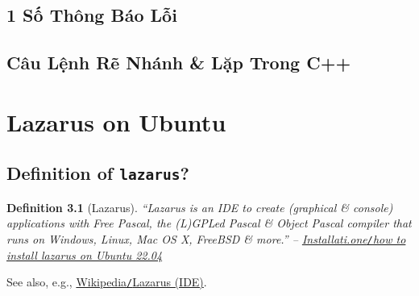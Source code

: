 \documentclass[oneside]{book}
\numberwithin{equation}{section}
\newtheorem{definition}{Definition}[section]
\begin{document}

\section{1 Số Thông Báo Lỗi}


\section{Câu Lệnh Rẽ Nhánh \& Lặp Trong C++}


\chapter{Lazarus on Ubuntu}

\section{Definition of \texttt{lazarus}?}

\begin{definition}[Lazarus]
	``\emph{Lazarus} is an IDE to create (graphical \& console) applications with Free Pascal, the (L)GPLed Pascal \& Object Pascal compiler that runs on Windows, Linux, Mac OS X, FreeBSD \& more.'' -- \href{https://installati.one/ubuntu/22.04/lazarus/}{Installati.one\emph{\texttt{/}}how to install lazarus on Ubuntu 22.04}
\end{definition}
See also, e.g., \href{https://vi.wikipedia.org/wiki/Lazarus_(IDE)}{Wikipedia\texttt{/}Lazarus (IDE)}.


\printbibliography[heading=bibintoc]
	
\end{document}
